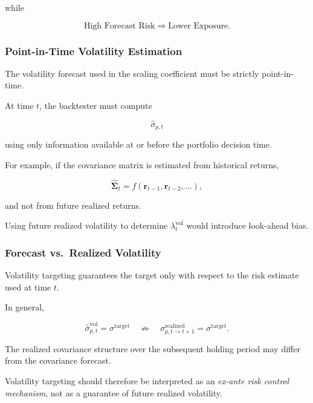 \documentclass[11pt,a4paper]{article}
\begin{document}
while

\begin{equation}
\boxed{
\text{High Forecast Risk}
\Rightarrow
\text{Lower Exposure}.
}
\end{equation}


\subsubsection{Point-in-Time Volatility Estimation}

The volatility forecast used in the scaling coefficient must be strictly
point-in-time.

At time $t$, the backtester must compute

\begin{equation}
\widehat{\sigma}_{p,t}
\end{equation}

using only information available at or before the portfolio decision time.

For example, if the covariance matrix is estimated from historical returns,

\begin{equation}
\widehat{\boldsymbol{\Sigma}}_t
=
f
\left(
\mathbf{r}_{t-1},
\mathbf{r}_{t-2},
\ldots
\right),
\end{equation}

and not from future realized returns.

Using future realized volatility to determine $\lambda_t^{\mathrm{vol}}$ would
introduce look-ahead bias.


\subsubsection{Forecast vs.\ Realized Volatility}

Volatility targeting guarantees the target only with respect to the risk
estimate used at time $t$.

In general,

\begin{equation}
\boxed{
\widehat{\sigma}_{p,t}^{\mathrm{vol}}
=
\sigma^{\mathrm{target}}
\quad\not\Rightarrow\quad
\sigma_{p,t\rightarrow t+1}^{\mathrm{realized}}
=
\sigma^{\mathrm{target}}.
}
\end{equation}

The realized covariance structure over the subsequent holding period may differ
from the covariance forecast.

Volatility targeting should therefore be interpreted as an \emph{ex-ante risk
control mechanism}, not as a guarantee of future realized volatility.
\end{document}
